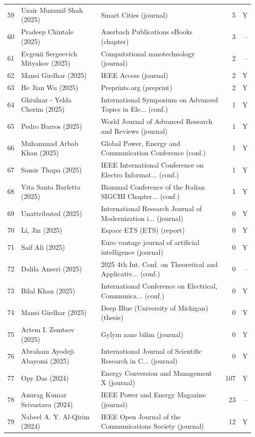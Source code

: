 \begin{longtable}{@{}r p{5.9cm} p{4.4cm} r r@{}}
59 & Uzair Muzamil Shah (2025) & Smart Cities (journal) & 5 & Y \\
60 & Pradeep Chintale (2025) & Auerbach Publications eBooks (chapter) & 3 & -- \\
61 & Evgenii Sergeevich Mityakov (2025) & Computational nanotechnology (journal) & 2 & -- \\
62 & Mansi Girdhar (2025) & IEEE Access (journal) & 2 & Y \\
63 & He Jian Wu (2025) & Preprints.org (preprint) & 2 & Y \\
64 & Ghiulnar - Yelda Cherim (2025) & International Symposium on Advanced Topics in Ele... (conf.) & 1 & Y \\
65 & Pedro Barros (2025) & World Journal of Advanced Research and Reviews (journal) & 1 & Y \\
66 & Muhammad Arbab Khan (2025) & Global Power, Energy and Communication Conference (conf.) & 1 & Y \\
67 & Samir Thapa (2025) & IEEE International Conference on Electro Informat... (conf.) & 1 & Y \\
68 & Vita Santa Barletta (2025) & Biannual Conference of the Italian SIGCHI Chapter... (conf.) & 1 & Y \\
69 & Unattributed (2025) & International Research Journal of Modernization i... (journal) & 0 & Y \\
70 & Li, Jin (2025) & Espace ETS (ETS) (report) & 0 & Y \\
71 & Saif Ali (2025) & Euro vantage journal of artificial intelligence (journal) & 0 & Y \\
72 & Dalila Anseri (2025) & 2025 4th Int. Conf. on Theoretical and Applicativ... (conf.) & 0 & -- \\
73 & Bilal Khan (2025) & International Conference on Electrical, Communica... (conf.) & 0 & Y \\
74 & Mansi Girdhar (2025) & Deep Blue (University of Michigan) (thesis) & 0 & Y \\
75 & Artem I. Zemtsov (2025) & Gylym zane bilim (journal) & 0 & Y \\
76 & Abraham Ayodeji Abayomi (2025) & International Journal of Scientific Research in C... (journal) & 0 & Y \\
77 & Opy Das (2024) & Energy Conversion and Management X (journal) & 107 & Y \\
78 & Anurag Kumar Srivastava (2024) & IEEE Power and Energy Magazine (journal) & 23 & -- \\
79 & Nabeel A. Y. Al-Qirim (2024) & IEEE Open Journal of the Communications Society (journal) & 12 & Y \\

\end{longtable}

